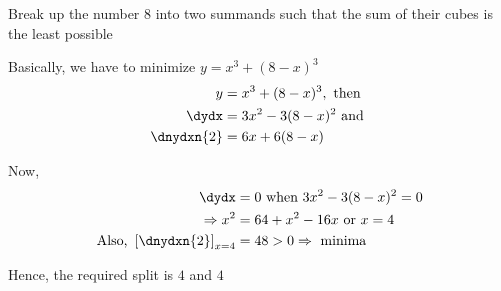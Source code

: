 
%
%
%
%
% 
% 

\question[2] Break up the number 8 into two summands such that the sum of their cubes
is the least possible


\ifprintanswers
\fi

\begin{solution}[\halfpage]
   Basically, we have to minimize $y = x^3 + (8-x)^3$
   \begin{align}
      y &= x^3 + (8-x)^3, \text{ then } \\
      \dydx &= 3x^2 - 3(8-x)^2 \text{ and } \\
      \dnydxn{2} &= 6x + 6(8-x)
   \end{align}
   
   Now, 
   \begin{align}
      \dydx &= 0 \text { when } 3x^2 - 3(8-x)^2 = 0 \\
      \Rightarrow x^2 &= 64 + x^2 -16x \text{ or } x = 4 \\
      \text{Also, }\left[\dnydxn{2}\right]_{x=4} &= 48 > 0 \Rightarrow \text{ minima }
   \end{align}
   
   Hence, the required split is $4$ and $4$
\end{solution}
